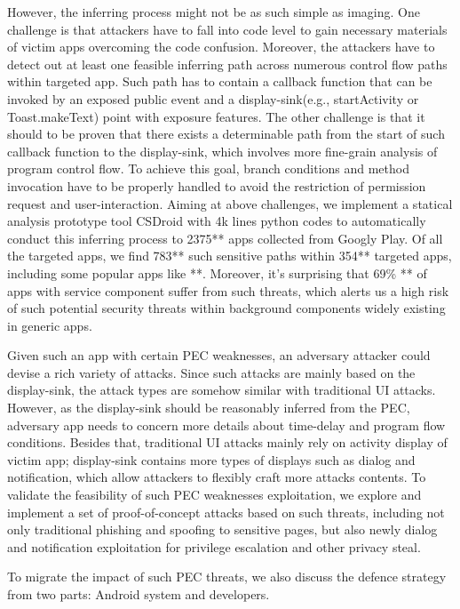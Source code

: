 \documentclass{sig-alternate-05-2015}
\begin{document}
However, the inferring process might not be as such simple as imaging. One challenge is that attackers have to fall into code level to gain necessary materials of victim apps overcoming the code confusion. Moreover, the attackers have to detect out at least one feasible inferring path across numerous control flow paths within targeted app. Such path has to contain a callback function that can be invoked by an exposed public event and a display-sink(e.g., startActivity or Toast.makeText) point with exposure features. The other challenge is that it should to be proven that there exists a determinable path from the start of such callback function to the display-sink, which involves more fine-grain analysis of program control flow. To achieve this goal, branch conditions and method invocation have to be properly handled to avoid the restriction of permission request and user-interaction.
Aiming at above challenges, we implement a statical analysis prototype tool CSDroid with 4k lines python codes to automatically conduct this inferring process to 2375** apps collected from Googly Play. Of all the targeted apps, we find 783** such sensitive paths within 354** targeted apps, including some popular apps like **. Moreover, it's surprising that 69\% **  of apps with service component suffer from such threats, which alerts us a high risk of such potential security threats within background components widely existing in generic apps.  

Given such an app with certain PEC weaknesses, an adversary attacker could devise a rich variety of attacks. Since such attacks are mainly based on the display-sink, the attack types are somehow similar with traditional UI attacks. However, as the display-sink should be reasonably inferred from the PEC, adversary app needs to concern more details about time-delay and program flow conditions. Besides that, traditional UI attacks mainly rely on activity display of victim app; display-sink contains more types of displays such as dialog and notification, which allow attackers to flexibly craft more attacks contents. To validate the feasibility of such PEC weaknesses exploitation, we explore and implement a set of proof-of-concept attacks based on such threats, including not only traditional phishing and spoofing to sensitive pages, but also newly dialog and notification exploitation for privilege escalation and other privacy steal. 

To migrate the impact of such PEC threats, we also discuss the defence strategy from two parts: Android system and developers. 
\end{document}
